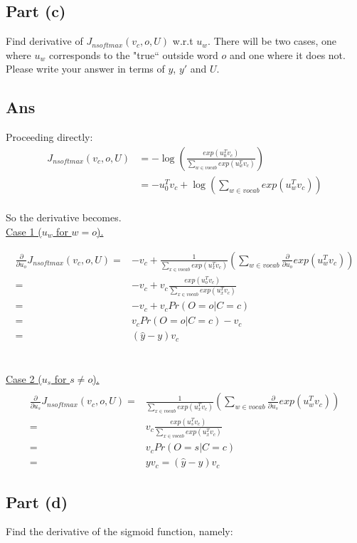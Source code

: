 \documentclass{article}
\begin{document}
\subsection*{Part (c)}
Find derivative of $J_{nsoftmax}(v_c, o, U)$ w.r.t $u_w$. There will be two cases, one where $u_w$ corresponds to the "true`` outside word $o$ and one where it does not. Please write your answer in terms of $y$, $y'$ and $U$.

\subsection*{Ans}
Proceeding directly:
\begin{align*}J_{nsoftmax}(v_c, o, U) &= -\log \left( \frac{exp(u_0^T v_c)}{\sum_{w \in vocab} exp(u_w^T v_c)  }    \right) \\
&= -u_0^T v_c + \log \left(\sum_{w \in vocab} exp(u_w^T v_c) \right)
\end{align*}
\\ So the derivative becomes.
\\ \underline{Case 1 ($u_w$ for $w=o$).} 

\begin{align*}
\frac{\partial}{\partial u_o} J_{nsoftmax}(v_c, o, U) =& - v_c + \frac{1}{\sum_{x \in vocab} exp(u_x^T v_c)}\left(\sum_{w \in vocab} \frac{\partial}{\partial u_o} exp(u_w^T v_c) \right) \\
=&-v_c + v_c \frac{exp(u_o^T v_c)}{\sum_{x \in vocab} exp(u_x^T v_c)} \\
=& -v_c + v_c Pr(O = o | C = c) \\
=& v_c Pr(O = o | C = c) -v_c \\
=&  (\hat{y} - y) v_c
\end{align*} \\
\\
\underline{Case 2 ($u_s$ for $s \neq o$).} 
\begin{align*}
\\
\frac{\partial}{\partial u_s} J_{nsoftmax}(v_c, o, U) =& \frac{1}{\sum_{x \in vocab} exp(u_x^T v_c)}\left(\sum_{w \in vocab} \frac{\partial}{\partial u_s} exp(u_w^T v_c) \right) \\
=& v_c \frac{exp(u_s^T v_c)}{\sum_{x \in vocab} exp(u_x^T v_c)} \\
=& v_c Pr(O = s | C = c) \\
=&  y v_c = (\hat{y} - y) v_c
\end{align*}

\subsection*{Part (d)}
Find the derivative of the sigmoid function, namely:
\end{document}
